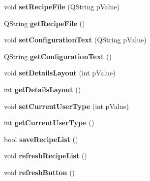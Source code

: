 \begin{DoxyCompactItemize}
\item 
\hypertarget{classQERecipe_a32b66775847e196ab1ecc80828bf6411}{
void {\bfseries setRecipeFile} (QString pValue)}
\label{classQERecipe_a32b66775847e196ab1ecc80828bf6411}

\item 
\hypertarget{classQERecipe_a20a9affb8c1ff03b665592cf2fab3c29}{
QString {\bfseries getRecipeFile} ()}
\label{classQERecipe_a20a9affb8c1ff03b665592cf2fab3c29}

\item 
\hypertarget{classQERecipe_a6e794310d8637f1a0288963c8d2a9fd8}{
void {\bfseries setConfigurationText} (QString pValue)}
\label{classQERecipe_a6e794310d8637f1a0288963c8d2a9fd8}

\item 
\hypertarget{classQERecipe_a3d5b95eb158650460b346bbe85113b7d}{
QString {\bfseries getConfigurationText} ()}
\label{classQERecipe_a3d5b95eb158650460b346bbe85113b7d}

\item 
\hypertarget{classQERecipe_aefcdc7bc1bc1fbca209d2c56e422253e}{
void {\bfseries setDetailsLayout} (int pValue)}
\label{classQERecipe_aefcdc7bc1bc1fbca209d2c56e422253e}

\item 
\hypertarget{classQERecipe_af999554624d21a2e66f687ec6b299e4c}{
int {\bfseries getDetailsLayout} ()}
\label{classQERecipe_af999554624d21a2e66f687ec6b299e4c}

\item 
\hypertarget{classQERecipe_a5cd3d4724418661beb0e6f30a6d98309}{
void {\bfseries setCurrentUserType} (int pValue)}
\label{classQERecipe_a5cd3d4724418661beb0e6f30a6d98309}

\item 
\hypertarget{classQERecipe_ab235b1ec55200463e443f87c0d3b6799}{
int {\bfseries getCurrentUserType} ()}
\label{classQERecipe_ab235b1ec55200463e443f87c0d3b6799}

\item 
\hypertarget{classQERecipe_af03fb27c3ef6080fe3d2ed60ea393be1}{
bool {\bfseries saveRecipeList} ()}
\label{classQERecipe_af03fb27c3ef6080fe3d2ed60ea393be1}

\item 
\hypertarget{classQERecipe_ad7f0fe4143891e13a6013de9e498d633}{
void {\bfseries refreshRecipeList} ()}
\label{classQERecipe_ad7f0fe4143891e13a6013de9e498d633}

\item 
\hypertarget{classQERecipe_a3e8dd3b5e200d963a7bb6de48767b7fc}{
void {\bfseries refreshButton} ()}
\label{classQERecipe_a3e8dd3b5e200d963a7bb6de48767b7fc}


\end{DoxyCompactItemize}
